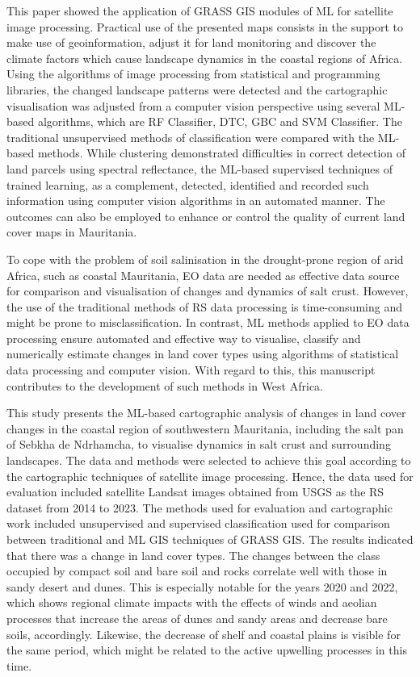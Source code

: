 \documentclass[12pt,a4paper,oneside]{article}
\def \newpar{\vspace{6pt}}
\begin{document}
\newpar This paper showed the application of GRASS GIS modules of ML for satellite image processing. Practical use of the presented maps consists in the support to make use of geoinformation, adjust it for land monitoring and discover the climate factors which cause landscape dynamics in the coastal regions of Africa. Using the algorithms of image processing from statistical and programming libraries, the changed landscape patterns were detected and the cartographic visualisation was adjusted from a computer vision perspective using several ML-based algorithms, which are RF Classifier, DTC, GBC and SVM Classifier. The traditional unsupervised methods of classification were compared with the ML-based methods. While clustering demonstrated difficulties in correct detection of land parcels using spectral reflectance, the ML-based supervised techniques of trained learning, as a complement, detected, identified and recorded such information using computer vision algorithms in an automated manner. The outcomes can also be employed to enhance or control the quality of current land cover maps in Mauritania.

\newpar To cope with the problem of soil salinisation in the drought-prone region of arid Africa, such as coastal Mauritania, EO data are needed as effective data source for comparison and visualisation of changes and dynamics of salt crust. However, the use of the traditional methods of RS data processing is time-consuming and might be prone to misclassification. In contrast, ML methods applied to EO data processing ensure automated and effective way to visualise, classify and numerically estimate changes in land cover types using algorithms of statistical data processing and computer vision. With regard to this, this manuscript  contributes to the development of such methods in West Africa.

\newpar This study presents the ML-based cartographic analysis of changes in land cover changes in the coastal region of southwestern Mauritania, including the salt pan of Sebkha de Ndrhamcha, to visualise dynamics in salt crust and surrounding landscapes. The data and methods were selected to achieve this goal according to the cartographic techniques of satellite image processing. Hence, the data used for evaluation included satellite Landsat images obtained from USGS as the RS dataset from 2014 to 2023. The methods used for evaluation and cartographic work included unsupervised and supervised classification used for comparison between traditional and ML GIS techniques of GRASS GIS. The results indicated that there was a change in land cover types. The changes between the class occupied by compact soil and bare soil and rocks correlate well with those in sandy desert and dunes. This is especially notable for the years 2020 and 2022, which shows regional climate impacts with the effects of winds and aeolian processes that increase the areas of dunes and sandy areas and decrease bare soils, accordingly. Likewise, the decrease of shelf and coastal plains is visible for the same period, which might be related to the active upwelling processes in this time.
\end{document}
